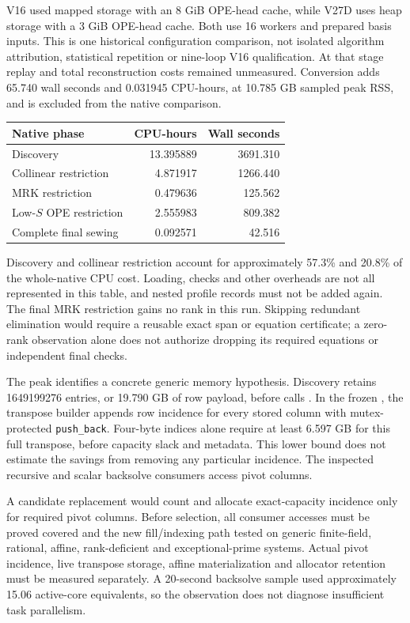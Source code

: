 \documentclass[11pt]{article}
\begin{document}
V16 used mapped storage with an 8 GiB OPE-head cache, while V27D uses
heap storage with a 3 GiB OPE-head cache. Both use 16 workers and prepared
basis inputs. This is one historical configuration comparison, not isolated
algorithm attribution, statistical repetition or nine-loop V16 qualification.
At that stage replay and total reconstruction costs remained unmeasured. Conversion
adds 65.740 wall seconds and 0.031945 CPU-hours, at 10.785 GB sampled peak
RSS, and is excluded from the native comparison.

\begin{center}
\begin{tabular}{lrr}\toprule
Native phase & CPU-hours & Wall seconds\\\midrule
Discovery & 13.395889 & 3691.310\\
Collinear restriction & 4.871917 & 1266.440\\
MRK restriction & 0.479636 & 125.562\\
Low-$S$ OPE restriction & 2.555983 & 809.382\\
Complete final sewing & 0.092571 & 42.516\\
\bottomrule
\end{tabular}
\end{center}
Discovery and collinear restriction account for approximately 57.3\% and
20.8\% of the whole-native CPU cost. Loading, checks and other overheads
are not all represented in this table, and nested profile records must not
be added again. The final MRK restriction gains no rank in this run.
Skipping redundant elimination would require a reusable exact span or
equation certificate; a zero-rank observation alone does not authorize
dropping its required equations or independent final checks.

The peak identifies a concrete generic memory hypothesis. Discovery retains
1649199276 entries, or 19.790 GB of row payload, before
 calls .
In the frozen , the transpose builder appends
row incidence for every stored column with mutex-protected
\texttt{push\_back}. Four-byte indices alone require at least 6.597 GB for
this full transpose, before capacity slack and metadata. This lower bound
does not estimate the savings from removing any particular incidence.
The inspected recursive and scalar backsolve consumers access pivot columns.

A candidate replacement would count and allocate exact-capacity incidence
only for required pivot columns. Before selection, all consumer accesses
must be proved covered and the new fill/indexing path tested on generic
finite-field, rational, affine, rank-deficient and exceptional-prime systems.
Actual pivot incidence, live transpose storage, affine materialization and
allocator retention must be measured separately. A 20-second backsolve
sample used approximately 15.06 active-core equivalents, so the observation
does not diagnose insufficient task parallelism.
\end{document}

